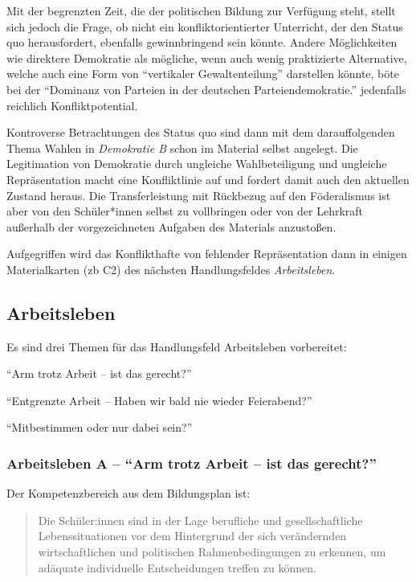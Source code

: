 Mit der begrenzten Zeit, die der politischen Bildung zur Verfügung steht, stellt sich jedoch die Frage, ob nicht ein konfliktorientierter Unterricht, der den Status quo herausfordert, ebenfalls gewinnbringend sein könnte. Andere Möglichkeiten wie direktere Demokratie als mögliche, wenn auch wenig praktizierte Alternative, welche auch eine Form von \enquote{vertikaler Gewaltenteilung} darstellen könnte, böte bei der \enquote{Dominanz von Parteien in der deutschen Parteiendemokratie.} \autocite[401]{Sturm.2021} jedenfalls reichlich Konfliktpotential. 


Kontroverse Betrachtungen des Status quo sind dann mit dem darauffolgenden Thema Wahlen in \emph{Demokratie B} schon im Material selbst angelegt. Die Legitimation von Demokratie durch ungleiche Wahlbeteiligung und ungleiche Repräsentation macht eine Konfliktlinie auf und fordert damit auch den aktuellen Zustand heraus. Die Transferleistung mit Rückbezug auf den Föderalismus ist aber von den Schüler*innen selbst zu vollbringen oder von der Lehrkraft außerhalb der vorgezeichneten Aufgaben des Materials anzustoßen. 

Aufgegriffen wird das Konflikthafte von fehlender Repräsentation dann in einigen Materialkarten (\gls{zb} C2) des nächsten Handlungsfeldes \emph{Arbeitsleben}.




\subsection{Arbeitsleben}
Es sind drei Themen für das Handlungsfeld Arbeitsleben vorbereitet:
\begin{myitemize}
    \item \enquote{Arm trotz Arbeit – ist das gerecht?}
    \item \enquote{Entgrenzte Arbeit – Haben wir bald nie wieder Feierabend?}
    \item \enquote{Mitbestimmen oder nur dabei sein?}
\end{myitemize}



\subsubsection{Arbeitsleben A -- \enquote{Arm trotz Arbeit – ist das gerecht?}}
Der Kompetenzbereich aus dem Bildungsplan ist: 
\begin{quotation}
    Die Schüler:innen sind in der Lage berufliche und gesellschaftliche Lebenssituationen vor dem Hintergrund der sich verändernden wirtschaftlichen und politischen Rahmenbedingungen zu erkennen, um adäquate individuelle Entscheidungen treffen zu können.

    \autocite[18]{bplan}
\end{quotation}

